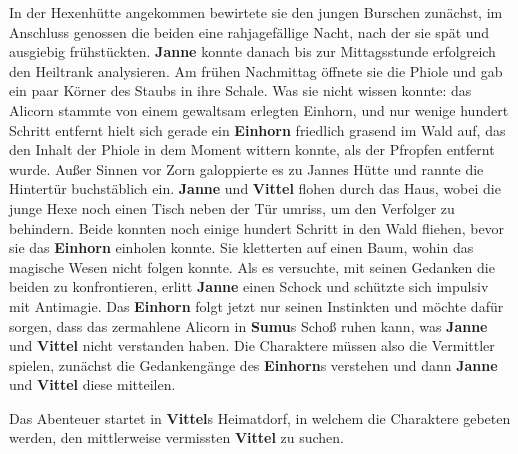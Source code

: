 In der Hexenhütte angekommen bewirtete sie den jungen Burschen zunächst, im Anschluss genossen die beiden eine rahjagefällige Nacht, nach der sie spät und 
ausgiebig frühstückten.
\textbf{Janne} konnte danach bis zur Mittagsstunde erfolgreich den Heiltrank analysieren.
Am frühen Nachmittag öffnete sie die Phiole und gab ein paar Körner des Staubs in ihre Schale. Was sie nicht wissen konnte:
das Alicorn stammte von einem gewaltsam erlegten Einhorn, und nur wenige hundert Schritt entfernt hielt sich gerade ein \textbf{Einhorn} friedlich grasend im Wald auf, das den Inhalt der Phiole in dem Moment wittern konnte, als der Pfropfen entfernt wurde.
Außer Sinnen vor Zorn galoppierte es zu Jannes Hütte und rannte die Hintertür buchstäblich ein.
\textbf{Janne} und \textbf{Vittel} flohen durch das Haus, wobei die junge Hexe noch einen Tisch neben der Tür umriss, um den Verfolger zu behindern.
Beide konnten noch einige hundert Schritt in den Wald fliehen, bevor sie das \textbf{Einhorn} einholen konnte.
Sie kletterten auf einen Baum, wohin das magische Wesen nicht folgen konnte.
Als es versuchte, mit seinen Gedanken die beiden zu konfrontieren, erlitt \textbf{Janne} einen Schock und schützte sich impulsiv mit Antimagie.
Das \textbf{Einhorn} folgt jetzt nur seinen Instinkten und möchte dafür sorgen, dass das zermahlene Alicorn in \textbf{Sumu}s Schoß ruhen kann, was \textbf{Janne} und \textbf{Vittel} nicht verstanden haben.
Die Charaktere müssen also die Vermittler spielen, zunächst die Gedankengänge des \textbf{Einhorn}s verstehen und dann \textbf{Janne} und \textbf{Vittel} diese mitteilen.

Das Abenteuer startet in \textbf{Vittel}s Heimatdorf, in welchem die Charaktere gebeten werden, den mittlerweise vermissten \textbf{Vittel} zu suchen. 

\neuespalte


